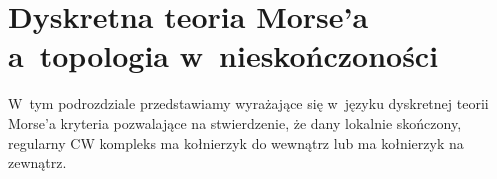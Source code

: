 \begin{comment}
Oczywiście $\{w\}\in \mcC_{M_f}(\mP(K))$. Wykażemy, że zbiór $\mcC_{M_f}(\mP(K))$ jest jednoelementowy. Ustalmy wierzchołek $v\in K$. Zauważmy, że jeśli $v\not=w$, to $m_f(\{v\})\in |\lk_K(v)|$, a~zatem $y_f(\{v\})\not=v$ i~w~konsekwencji $\left(\{v,y_f(\{v\})\},\{v\}\right)\in M_f$, czyli $\{v\}\not\in \mcC_{M_f}(\mP(K))$.

Przypuśćmy, że istnieje $\sigma\in \mcC_{M_f}(\mP(K))$, $\dim(\sigma)\geq 1$. Niech $\tau\in \st_{K}(\sigma\smallsetminus\{y_f(\sigma)\})$~będzie dowolnym sympleksem zawierającym $\mu_f(\sigma)$. Oczywiście $y_f(\sigma)\in \tau$. 
\end{proof}


\begin{wn}[por.~{\cite[Corollaries 3.2.3, 3.2.4]{Adiprasito13}}]
Jeżeli $\mathbb{K}=\left(K,\ \Shapes(\mathbb{K}),\ \{f_\sigma\}_{\sigma\in K}\right)$ jest regularnym kompleksem $M_0$-symplicjalnym spełniającym założenia twierdzenia \ref{tw-bridsona} oraz $(|K|,d_{\mathbb{K}})$ jest przestrzenią $\CAT(0)$, to kompleks symplicjalny $K$~jest $\infty$-zgniatalny. 
\end{wn}

Zastanawiające jest, które z~pozostałych wyników pracy Adiprasito i~Benedettiego \cite{Adiprasito13} można przenieść na niezwarte obiekty.
\end{comment}



\section{Dyskretna teoria Morse'a a~topologia w~nieskończoności}\label{topologia-w-nsk}

W~tym podrozdziale przedstawiamy wyrażające się w~języku dyskretnej teorii Morse'a kryteria pozwalające na stwierdzenie, że dany lokalnie skończony, regularny CW kompleks ma kołnierzyk do wewnątrz lub ma kołnierzyk na zewnątrz.

